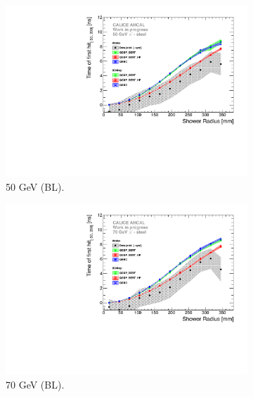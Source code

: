 \begin{figure}[htbp!]
\begin{subfigure}[t]{0.5\textwidth}
		\includegraphics[width=1\textwidth]{chap5/fig_AHCAL_timing/Pions/ComparisonToSim/Time_Radius_50GeV_BL.pdf}
		\caption{50 GeV (BL).} \label{fig:Radius_BL_SimData_50GeV}
	\end{subfigure}
	\hfill
	\begin{subfigure}[t]{0.5\textwidth}
		\centering
		\includegraphics[width=1\textwidth]{chap5/fig_AHCAL_timing/Pions/ComparisonToSim/Time_Radius_70GeV_BL.pdf}
		\caption{70 GeV (BL).} \label{fig:Radius_BL_SimData_70GeV}
	\end{subfigure}
	\hfill
	\begin{subfigure}[t]{0.5\textwidth}
		\centering

\end{subfigure}
\end{figure}
